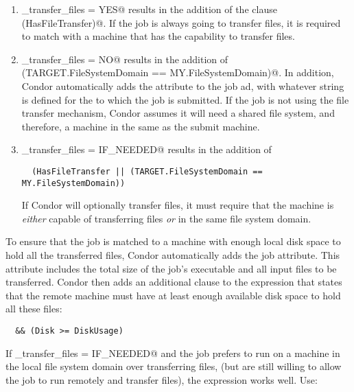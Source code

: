 \begin{enumerate}

\item 
\verb@should_transfer_files = YES@ results in the addition of
the clause \verb@(HasFileTransfer)@.
  If the job is always going to transfer files, it is required to 
  match with a machine that has the capability to transfer files.

\item 
\verb@should_transfer_files = NO@ results in the addition of
  \verb@(TARGET.FileSystemDomain == MY.FileSystemDomain)@.
  In addition, Condor automatically adds the
   attribute to the job ad, with whatever
  string is defined for the  to which the job is
  submitted.
  If the job is not using the file transfer mechanism, Condor assumes
  it will need a shared file system, and therefore, a machine in the
  same  as the submit machine.

\item \verb@should_transfer_files = IF_NEEDED@ results in the addition of
\footnotesize
\begin{verbatim}
  (HasFileTransfer || (TARGET.FileSystemDomain == MY.FileSystemDomain))
\end{verbatim}
\normalsize
  If Condor will optionally transfer files, it must require
  that the machine is \emph{either} capable of transferring files
  \emph{or} in the same file system domain.

\end{enumerate}

To ensure that the job is matched to a machine with enough local disk
space to hold all the transferred files, Condor automatically adds the
 job attribute.
This attribute includes the total
size of the job's executable and all input files to be transferred.
Condor then adds an additional clause to the 
expression that states that the remote machine must have at least
enough available disk space to hold all these files:
\begin{verbatim}
  && (Disk >= DiskUsage)
\end{verbatim}

If \verb@should_transfer_files = IF_NEEDED@ and the job prefers
to run on a machine in the local file system domain
over transferring files,
(but are still willing to allow the job to run remotely and transfer
files), the  expression works well.  Use:

